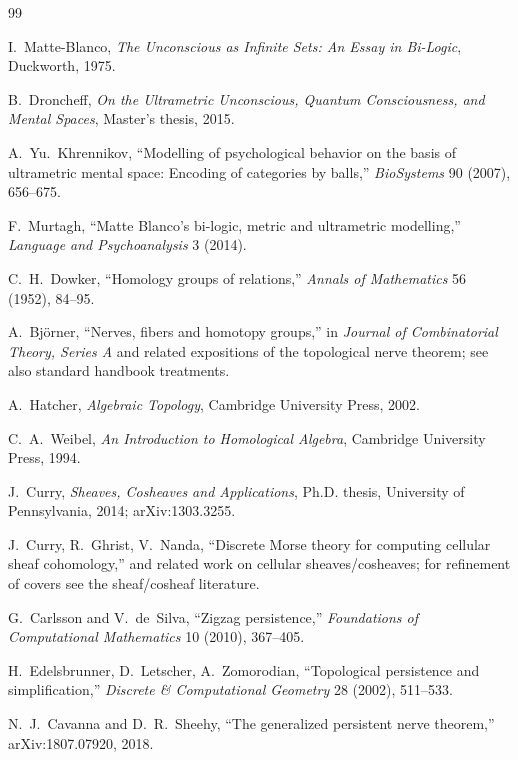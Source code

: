 \documentclass[11pt]{article}
\begin{document}
\begin{thebibliography}{99}

I.~Matte-Blanco,
\emph{The Unconscious as Infinite Sets: An Essay in Bi-Logic},
Duckworth, 1975.

B.~Droncheff,
\emph{On the Ultrametric Unconscious, Quantum Consciousness, and Mental Spaces},
Master's thesis, 2015.

A.~Yu.~Khrennikov,
``Modelling of psychological behavior on the basis of ultrametric mental space: Encoding of categories by balls,''
\emph{BioSystems} 90 (2007), 656--675.

F.~Murtagh,
``Matte Blanco's bi-logic, metric and ultrametric modelling,''
\emph{Language and Psychoanalysis} 3 (2014).

C.~H.~Dowker,
``Homology groups of relations,''
\emph{Annals of Mathematics} 56 (1952), 84--95.

A.~Bj\"orner,
``Nerves, fibers and homotopy groups,''
in \emph{Journal of Combinatorial Theory, Series A} and related expositions of the topological nerve theorem; see also standard handbook treatments.

A.~Hatcher,
\emph{Algebraic Topology},
Cambridge University Press, 2002.

C.~A.~Weibel,
\emph{An Introduction to Homological Algebra},
Cambridge University Press, 1994.

J.~Curry,
\emph{Sheaves, Cosheaves and Applications},
Ph.D. thesis, University of Pennsylvania, 2014; arXiv:1303.3255.

J.~Curry, R.~Ghrist, V.~Nanda,
``Discrete Morse theory for computing cellular sheaf cohomology,'' and related work on cellular sheaves/cosheaves; for refinement of covers see the sheaf/cosheaf literature.

G.~Carlsson and V.~de~Silva,
``Zigzag persistence,''
\emph{Foundations of Computational Mathematics} 10 (2010), 367--405.

H.~Edelsbrunner, D.~Letscher, A.~Zomorodian,
``Topological persistence and simplification,''
\emph{Discrete \& Computational Geometry} 28 (2002), 511--533.

N.~J.~Cavanna and D.~R.~Sheehy,
``The generalized persistent nerve theorem,''
arXiv:1807.07920, 2018.


\end{thebibliography}
\end{document}
